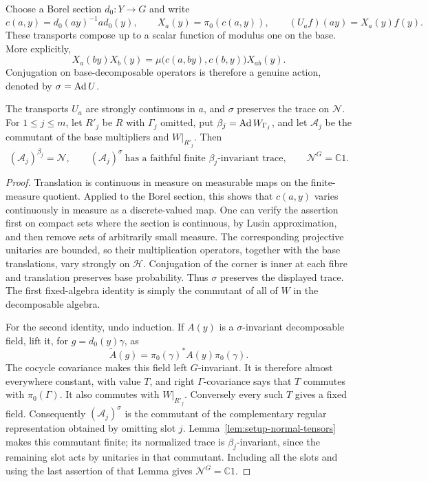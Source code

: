 Choose a Borel section $d_0:Y\to G$ and write
\[
 c(a,y)=d_0(ay)^{-1}ad_0(y),\qquad
 X_a(y)=\pi_0(c(a,y)),\qquad
 (U_af)(ay)=X_a(y)f(y).
\]
These transports compose up to a scalar function of modulus one on
the base.  More explicitly,
\[
 X_a(by)X_b(y)
   =\mu\bigl(c(a,by),c(b,y)\bigr)X_{ab}(y).
\]
Conjugation on base-decomposable operators is therefore a genuine
action, denoted by $\sigma=\operatorname{Ad} U$.

\begin{proposition}
\label{prop:setup-induced-algebras}
The transports $U_a$ are strongly continuous in $a$, and $\sigma$
preserves the trace on $\mathcal N$.  For $1\leq j\leq m$, let
$R'_j$ be $R$ with $\Gamma_j$ omitted, put
$\beta_j=\operatorname{Ad} W_{\Gamma_j}$, and let $\mathcal A_j$ be the
commutant of the base multipliers and $W|_{R'_j}$.  Then
\[
 (\mathcal A_j)^{\beta_j}=\mathcal N,
 \qquad
 (\mathcal A_j)^\sigma
 \ \text{has a faithful finite $\beta_j$-invariant trace},
 \qquad
 \mathcal N^G=\mathbb C1.
\]
\end{proposition}

\begin{proof}
Translation is continuous in measure on measurable maps on the
finite-measure quotient.  Applied to the Borel section, this shows
that $c(a,y)$ varies continuously in measure as a discrete-valued
map.  One can verify the assertion first on compact sets where the
section is continuous, by Lusin approximation, and then remove sets
of arbitrarily small measure.  The corresponding projective
unitaries are bounded, so their multiplication operators, together
with the base translations, vary strongly on $\mathcal H$.
Conjugation of the corner is inner at each fibre and translation
preserves base probability.  Thus $\sigma$ preserves the displayed
trace.  The first fixed-algebra identity is simply the commutant of
all of $W$ in the decomposable algebra.

For the second identity, undo induction.  If $A(y)$ is a
$\sigma$-invariant decomposable field, lift it, for
$g=d_0(y)\gamma$, as
\[
 \widetilde A(g)=\pi_0(\gamma)^*A(y)\pi_0(\gamma).
\]
The cocycle covariance makes this field left $G$-invariant.  It is
therefore almost everywhere constant, with value $T$, and right
$\Gamma$-covariance says that $T$ commutes with $\pi_0(\Gamma)$.
It also commutes with $W|_{R'_j}$.  Conversely every such $T$ gives
a fixed field.  Consequently $(\mathcal A_j)^\sigma$ is the
commutant of the complementary regular representation obtained by
omitting slot $j$.  Lemma~\ref{lem:setup-normal-tensors} makes this
commutant finite; its normalized trace is $\beta_j$-invariant,
since the remaining slot acts by unitaries in that commutant.
Including all the slots and using the last assertion of that Lemma
gives $\mathcal N^G=\mathbb C1$.
\end{proof}



